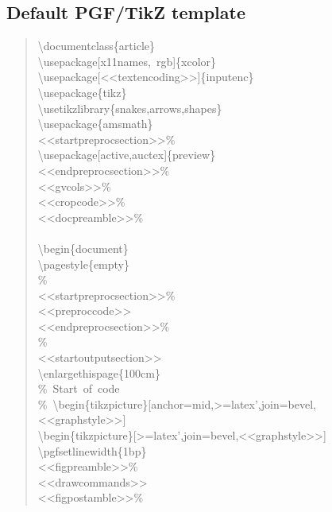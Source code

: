 \documentclass[10pt,a4paper,english]{article}
\begin{document}
\subsection*{Default PGF/TikZ template}
\label{default-pgf-tikz-template}
\begin{quote}{\ttfamily \raggedright \noindent
{\textbackslash}documentclass{\{}article{\}}~\\
{\textbackslash}usepackage{[}x11names,~rgb{]}{\{}xcolor{\}}~\\
{\textbackslash}usepackage{[}<{}<textencoding>{}>{]}{\{}inputenc{\}}~\\
{\textbackslash}usepackage{\{}tikz{\}}~\\
{\textbackslash}usetikzlibrary{\{}snakes,arrows,shapes{\}}~\\
{\textbackslash}usepackage{\{}amsmath{\}}~\\
<{}<startpreprocsection>{}>{\%}~\\
{\textbackslash}usepackage{[}active,auctex{]}{\{}preview{\}}~\\
<{}<endpreprocsection>{}>{\%}~\\
<{}<gvcols>{}>{\%}~\\
<{}<cropcode>{}>{\%}~\\
<{}<docpreamble>{}>{\%}~\\
~\\
{\textbackslash}begin{\{}document{\}}~\\
{\textbackslash}pagestyle{\{}empty{\}}~\\
{\%}~\\
<{}<startpreprocsection>{}>{\%}~\\
<{}<preproccode>{}>~\\
<{}<endpreprocsection>{}>{\%}~\\
{\%}~\\
<{}<startoutputsection>{}>~\\
{\textbackslash}enlargethispage{\{}100cm{\}}~\\
{\%}~Start~of~code~\\
{\%}~{\textbackslash}begin{\{}tikzpicture{\}}{[}anchor=mid,>=latex',join=bevel,<{}<graphstyle>{}>{]}~\\
{\textbackslash}begin{\{}tikzpicture{\}}{[}>=latex',join=bevel,<{}<graphstyle>{}>{]}~\\
{\textbackslash}pgfsetlinewidth{\{}1bp{\}}~\\
<{}<figpreamble>{}>{\%}~\\
<{}<drawcommands>{}>~\\
<{}<figpostamble>{}>{\%}~\\
}
\end{quote}
\end{document}
